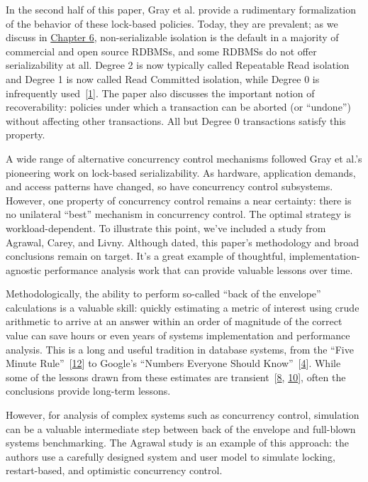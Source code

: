 \documentclass[b5paper,11pt,twoside,openright]{book}
\begin{document}
In the second half of this paper, Gray et al. provide a rudimentary
formalization of the behavior of these lock-based policies. Today, they
are prevalent; as we discuss in \hyperref[ch6-isolation]{Chapter 6},
non-serializable isolation is the default in a majority of commercial
and open source RDBMSs, and some RDBMSs do not offer serializability at
all. Degree 2 is now typically called Repeatable Read isolation and
Degree 1 is now called Read Committed isolation, while Degree 0 is
infrequently used~{{[}\protect\hyperlink{ref-ansi-critique}{1}{]}}. The
paper also discusses the important notion of recoverability: policies
under which a transaction can be aborted (or ``undone'') without
affecting other transactions. All but Degree 0 transactions satisfy this
property.

A wide range of alternative concurrency control mechanisms followed Gray
et al.'s pioneering work on lock-based serializability. As hardware,
application demands, and access patterns have changed, so have
concurrency control subsystems. However, one property of concurrency
control remains a near certainty: there is no unilateral ``best''
mechanism in concurrency control. The optimal strategy is
workload-dependent. To illustrate this point, we've included a study
from Agrawal, Carey, and Livny. Although dated, this paper's methodology
and broad conclusions remain on target. It's a great example of
thoughtful, implementation-agnostic performance analysis work that can
provide valuable lessons over time.

Methodologically, the ability to perform so-called ``back of the
envelope'' calculations is a valuable skill: quickly estimating a metric
of interest using crude arithmetic to arrive at an answer within an
order of magnitude of the correct value can save hours or even years of
systems implementation and performance analysis. This is a long and
useful tradition in database systems, from the ``Five Minute
Rule''~{{[}\protect\hyperlink{ref-fiveminute}{12}{]}} to Google's
``Numbers Everyone Should
Know''~{{[}\protect\hyperlink{ref-google-numbers}{4}{]}}. While some of
the lessons drawn from these estimates are
transient~{{[}\protect\hyperlink{ref-five-twenty}{8},
  \protect\hyperlink{ref-five-ten}{10}{]}}, often the conclusions provide
long-term lessons.

However, for analysis of complex systems such as concurrency control,
simulation can be a valuable intermediate step between back of the
envelope and full-blown systems benchmarking. The Agrawal study is an
example of this approach: the authors use a carefully designed system
and user model to simulate locking, restart-based, and optimistic
concurrency control.
\end{document}
